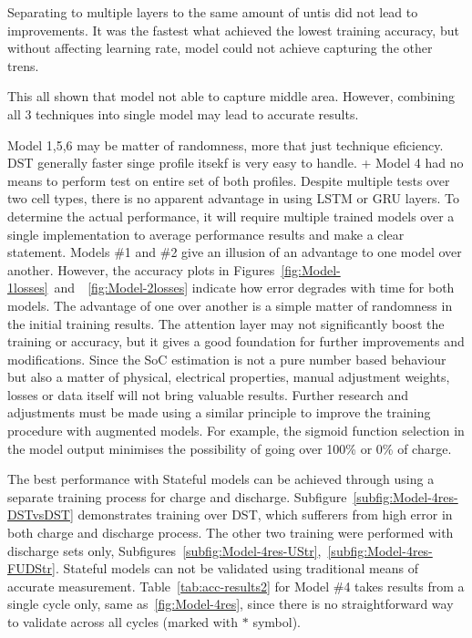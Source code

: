Separating to multiple layers to the same amount of untis did not lead to improvements.
It was the fastest what achieved the lowest training accuracy, but without affecting learning rate, model could not achieve capturing the other trens.

%
%
This all shown that model not able to capture middle area.
However, combining all 3 techniques into single model may lead to accurate results.

%
%
Model 1,5,6 may be matter of randomness, more that just technique eficiency.
DST generally faster singe profile itsekf is very easy to handle.
+ Model 4 had no means to perform test on entire set of both profiles.
%
%
%
%
Despite multiple tests over two cell types, there is no apparent advantage in using LSTM or GRU layers.
To determine the actual performance, it will require multiple trained models over a single implementation to average performance results and make a clear statement.
Models \#1 and \#2 give an illusion of an advantage to one model over another.
However, the accuracy plots in \mbox{Figures~\ref{fig:Model-1losses} and ~\ref{fig:Model-2losses}} indicate how error degrades with time for both models.
The advantage of one over another is a simple matter of randomness in the initial training results.
The attention layer may not significantly boost the training or accuracy, but it gives a good foundation for further improvements and modifications.
Since the SoC estimation is not a pure number based behaviour but also a matter of physical, electrical properties, manual adjustment weights, losses or data itself will not bring valuable results.
Further research and adjustments must be made using a similar principle to improve the training procedure with augmented models. 
For example, the sigmoid function selection in the model output minimises the possibility of going over 100\% or 0\% of charge.

%
%
The best performance with Stateful models can be achieved through using a separate training process for charge and discharge. 
\mbox{Subfigure~\ref{subfig:Model-4res-DSTvsDST}} demonstrates training over DST, which sufferers from high error in both charge and discharge process.
The other two training were performed with discharge sets only, \mbox{Subfigures~\ref{subfig:Model-4res-UStr}, \ref{subfig:Model-4res-FUDStr}}.
Stateful models can not be validated using traditional means of accurate measurement.
\mbox{Table~\ref{tab:acc-results2}} for Model \#4 takes results from a single cycle only, same as~\ref{fig:Model-4res}, since there is no straightforward way to validate across all cycles (marked with $*$ symbol).

